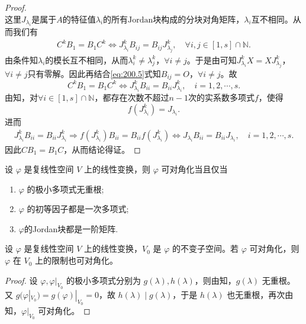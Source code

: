 \documentclass[../../main.tex]{subfiles}%
\begin{document}
\begin{proof}
\[\]
这里$J_{\lambda_i}$是属于$A$的特征值$\lambda_i$的所有$\text{Jordan}$块构成的分块对角矩阵，$\lambda_i$互不相同。从而我们有
\begin{align}
C^k B_1 = B_1 C^k \Longleftrightarrow J_{\lambda_i}^k B_{ij} = B_{ij} J_{\lambda_j}^k, \quad \forall i,j \in [1,s] \cap \mathbb{N}.
\label{eq:200.5}
\end{align}
由条件知$\lambda_i$的模长互不相同，从而$\lambda_i^k \ne \lambda_j^k$，$\forall i \ne j$。于是由可知$J_{\lambda_i}^k X = X J_{\lambda_j}^k$，$\forall i \ne j$只有零解。因此再结合\eqref{eq:200.5}式知$B_{ij} = O$，$\forall i \ne j$。故
\[
C^k B_1 = B_1 C^k \Longleftrightarrow J_{\lambda_i}^k B_{ii} = B_{ii} J_{\lambda_i}^k, \quad i = 1,2,\cdots,s.
\]
由知，对$\forall i \in [1,s] \cap \mathbb{N}$，都存在次数不超过$n - 1$次的实系数多项式$f$，使得
\[
f\left( J_{\lambda _i}^{k} \right) =J_{\lambda _i}.
\]
进而
\begin{align*}
J_{\lambda _i}^{k}B_{ii}=B_{ii}J_{\lambda _i}^{k}\Longrightarrow f\left( J_{\lambda _i}^{k} \right) B_{ii}=B_{ii}f\left( J_{\lambda _i}^{k} \right) \Longleftrightarrow J_{\lambda _i}B_{ii}=B_{ii}J_{\lambda _i},\quad i=1,2,\cdots ,s.
\end{align*}
因此$C B_1 = B_1 C$，从而结论得证。

\end{proof}

\begin{corollary}\label{corollary:矩阵可对角化的几何叙述}
设 $\varphi$ 是复线性空间 $V$ 上的线性变换，则 $\varphi$ 可对角化当且仅当
\begin{enumerate}
\item $\varphi$ 的极小多项式无重根;

\item $\varphi$ 的初等因子都是一次多项式;

\item $\varphi$的Jordan块都是一阶矩阵.
\end{enumerate}
\end{corollary}

\begin{corollary}\label{corollary:线性变换可对角化则其在不变子空间的限制上也可对角化}
设 $\varphi$ 是复线性空间 $V$ 上的线性变换，$V_0$ 是 $\varphi$ 的不变子空间。若 $\varphi$ 可对角化，则 $\varphi$ 在 $V_0$ 上的限制也可对角化。
\end{corollary}
\begin{proof}

设 $\varphi,\varphi|_{V_0}$ 的极小多项式分别为 $g(\lambda),h(\lambda)$，则由知，$g(\lambda)$ 无重根。又 $g(\varphi|_{V_0}) = g(\varphi)|_{V_0} = 0$，故 $h(\lambda)\mid g(\lambda)$，于是 $h(\lambda)$ 也无重根，再次由知，$\varphi|_{V_0}$ 可对角化。

\end{proof}
\end{document}

